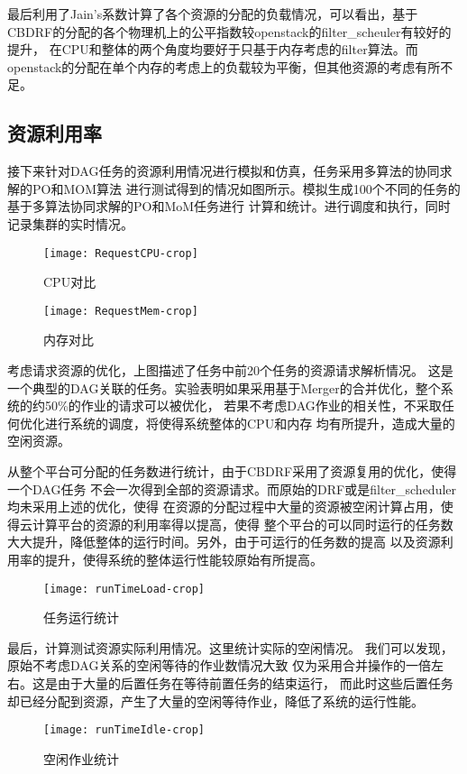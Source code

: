 最后利用了Jain's系数计算了各个资源的分配的负载情况，可以看出，基于
CBDRF的分配的各个物理机上的公平指数较openstack的filter\_scheuler有较好的提升，
在CPU和整体的两个角度均要好于只基于内存考虑的filter算法。而
openstack的分配在单个内存的考虑上的负载较为平衡，但其他资源的考虑有所不足。
\subsection{资源利用率}
接下来针对DAG任务的资源利用情况进行模拟和仿真，任务采用多算法的协同求解的PO和MOM算法
进行测试得到的情况如图所示。模拟生成100个不同的任务的基于多算法协同求解的PO和MoM任务进行
计算和统计。进行调度和执行，同时记录集群的实时情况。
\begin{figure}[htbp]
\centering\texttt{[image: RequestCPU-crop]}
\caption{CPU对比}\label{fig:RequestCPU}
\end{figure}
\begin{figure}[htbp]
\centering\texttt{[image: RequestMem-crop]}
\caption{内存对比}\label{fig:RequestMem}
\end{figure}

考虑请求资源的优化，上图描述了任务中前20个任务的资源请求解析情况。
这是一个典型的DAG关联的任务。实验表明如果采用基于Merger的合并优化，整个系统的约50\%的作业的请求可以被优化，
若果不考虑DAG作业的相关性，不采取任何优化进行系统的调度，将使得系统整体的CPU和内存
均有所提升，造成大量的空闲资源。

从整个平台可分配的任务数进行统计，由于CBDRF采用了资源复用的优化，使得一个DAG任务
不会一次得到全部的资源请求。而原始的DRF或是filter\_scheduler均未采用上述的优化，使得
在资源的分配过程中大量的资源被空闲计算占用，使得云计算平台的资源的利用率得以提高，使得
整个平台的可以同时运行的任务数大大提升，降低整体的运行时间。另外，由于可运行的任务数的提高
以及资源利用率的提升，使得系统的整体运行性能较原始有所提高。
\begin{figure}[htbp]
\centering\texttt{[image: runTimeLoad-crop]}
\caption{任务运行统计}\label{fig:runTimeLoad}
\end{figure}

最后，计算测试资源实际利用情况。这里统计实际的空闲情况。
我们可以发现，原始不考虑DAG关系的空闲等待的作业数情况大致
仅为采用合并操作的一倍左右。这是由于大量的后置任务在等待前置任务的结束运行，
而此时这些后置任务却已经分配到资源，产生了大量的空闲等待作业，降低了系统的运行性能。
\begin{figure}[htbp]
\centering\texttt{[image: runTimeIdle-crop]}
\caption{空闲作业统计}\label{fig:runTimeIdle}
\end{figure}

